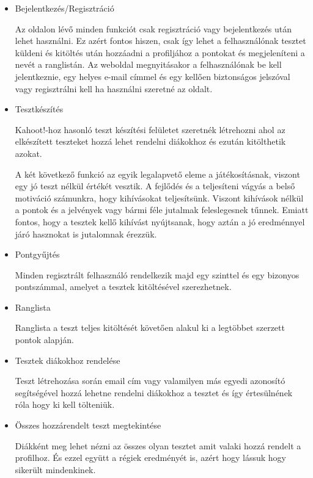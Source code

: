 
\begin{itemize}
    \item {Bejelentkezés/Regisztráció}
          \begin{addmargin}[\parindent]{0pt}
              Az oldalon lévő minden funkciót csak regisztráció vagy bejelentkezés után lehet használni. Ez azért fontos hiszen, csak így lehet a felhasználónak tesztet küldeni és kitöltés után hozzáadni a profiljához a pontokat és megjeleníteni a nevét a ranglistán. Az weboldal megnyitásakor a felhasználónak be kell jelentkeznie, egy helyes e-mail címmel és egy kellően biztonságos jelszóval vagy regisztrálni kell ha használni szeretné az oldalt.
          \end{addmargin}
    \item {Tesztkészítés}
          \begin{addmargin}[\parindent]{0pt}
              Kahoot!-hoz hasonló teszt készítési felületet szeretnék létrehozni ahol az elkészített teszteket hozzá lehet rendelni diákokhoz és ezután kitölthetik azokat.

              A két következő funkció az egyik legalapvető eleme a játékosításnak, viszont egy jó teszt nélkül értékét vesztik. A fejlődés és a teljesíteni vágyás a belső motiváció számunkra, hogy kihívásokat teljesítsünk. Viszont kihívások nélkül a pontok és a jelvények vagy bármi féle jutalmak feleslegesnek tűnnek. Emiatt fontos, hogy a tesztek kellő kihívást nyújtsanak, hogy aztán a jó eredménnyel járó hasznokat is jutalomnak érezzük.
          \end{addmargin}
    \item {Pontgyűjtés}
          \begin{addmargin}[\parindent]{0pt}
              Minden regisztrált felhasználó rendelkezik majd egy szinttel és egy bizonyos pontszámmal, amelyet a tesztek kitöltésével szerezhetnek.
          \end{addmargin}
    \item {Ranglista}
          \begin{addmargin}[\parindent]{0pt}
              Ranglista a teszt teljes kitöltését követően alakul ki a legtöbbet szerzett pontok alapján.
          \end{addmargin}
    \item {Tesztek diákokhoz rendelése}
          \begin{addmargin}[\parindent]{0pt}
              Teszt létrehozása során email cím vagy valamilyen más egyedi azonosító segítségével hozzá lehetne rendelni diákokhoz a tesztet és így értesülnének róla hogy ki kell tölteniük.
          \end{addmargin}
    \item {Összes hozzárendelt teszt megtekintése}
          \begin{addmargin}[\parindent]{0pt}
              Diákként meg lehet nézni az összes olyan tesztet amit valaki hozzá rendelt a profilhoz. És ezzel együtt a régiek eredményét is, azért hogy lássuk hogy sikerült mindenkinek.
          \end{addmargin}
\end{itemize}


